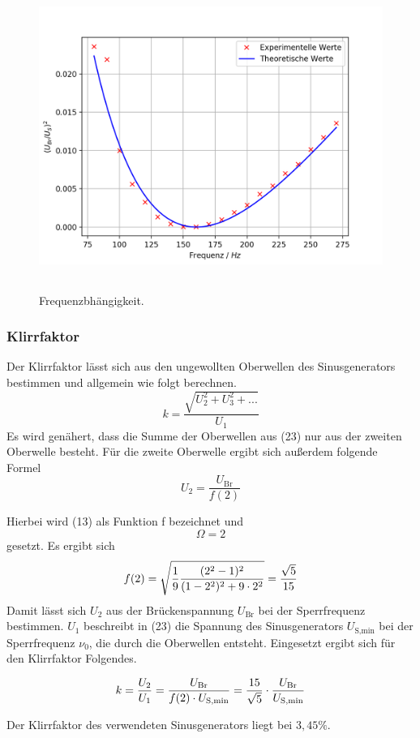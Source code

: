 \begin{figure}[H]
  \centering
  \includegraphics[height=10cm]{Auswertung/Frequenz.pdf}
  \caption{Frequenzbhängigkeit.}
  \label{fig:Frequenz}
\end{figure}

\subsubsection{Klirrfaktor}
Der Klirrfaktor lässt sich aus den ungewollten Oberwellen des Sinusgenerators bestimmen und allgemein wie folgt berechnen.
\begin{equation}
    k = \frac{\sqrt{U_2^2 + U_3^2 + ...}}{U_1}
\end{equation}
Es wird genähert, dass die Summe der Oberwellen aus (23) nur aus der zweiten Oberwelle besteht.
Für die zweite Oberwelle ergibt sich außerdem folgende Formel
\begin{equation}
    U_2 = \frac{U_\text{Br}}{f(2)}
\end{equation}

Hierbei wird (13) als Funktion f bezeichnet und
\begin{equation*}
    \Omega = 2
\end{equation*} gesetzt.
Es ergibt sich
\begin{equation}
	f(2) = \sqrt{\frac{1}{9}\frac{(2^2 - 1)^2}{(1-2^2)^2 + 9 \cdot 2^2}} = \frac{\sqrt{5}}{15} \notag
\end{equation}
Damit lässt sich $U_2$ aus der Brückenspannung $U_\text{Br}$ bei der Sperrfrequenz bestimmen.
$U_1$ beschreibt in (23) die Spannung des Sinusgenerators $U_\text{S,min}$ bei der Sperrfrequenz $\nu_0$, die durch die Oberwellen entsteht.
Eingesetzt ergibt sich für den Klirrfaktor Folgendes.

\begin{equation}
    k = \frac{U_2}{U_1} = \frac{U_\text{Br}}{f(2) \cdot U_\text{S,min}} = \frac{15}{\sqrt{5}} \cdot \frac{U_\text{Br}}{U_\text{S,min}} \notag
\end{equation}

Der Klirrfaktor des verwendeten Sinusgenerators liegt bei $3,45\%$.
